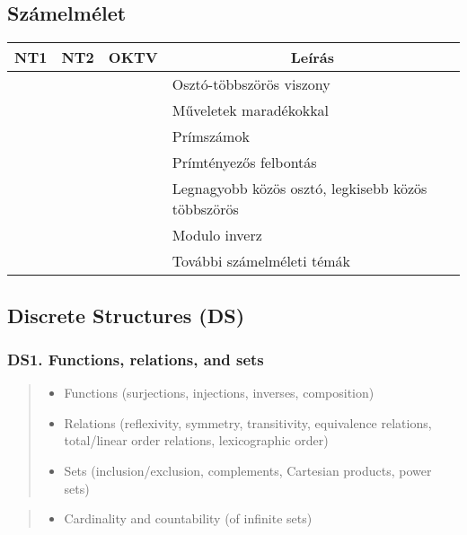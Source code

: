\documentclass[a4paper,11pt,oneside]{article}
\newcommand{\cmark}{\ding{51}}%
\newcommand{\xmark}{\ding{55}}%
\newcommand{\CC}[1]{#1}
\newcommand{\cincl}{{\small\cmark}}
\newcommand{\cdefi}{{\small\cmark\faFileTextO}}
\newcommand{\cemay}{{\small\xmark\faQuestionCircle}}
\newcommand{\cexcl}{{\small\xmark}}
\newcommand{\Idefine}{\item[\hbox to 1.8em{\cdefi\hfill}]}
\newcommand{\Iexcluded}{\item[\hbox to 1.8em{\cexcl\hfill}]}
\newcommand{\ctable}[1]{
    \begin{center}
        \begin{longtable}{ | C | C | C | m{8cm} | } %
        \hline
        \textbf{NT1} & \textbf{NT2} & \textbf{OKTV} & \multicolumn{1}{|c|}{\textbf{Leírás}} \\ \hline
        \endhead
        #1
        \end{longtable}
    \end{center}
}
\newenvironment{myitemize}{\begin{quote}\begin{itemize}\itemsep 0pt}{\end{itemize}\end{quote}}
\begin{document}
\subsection{Számelmélet} %

\ctable {
    \cincl & \cincl & \cincl & Osztó-többszörös viszony
    \\ \hline %
    \cincl & \cincl & \cincl & Műveletek maradékokkal 
    \\ \hline %
    \cdefi & \cincl & \cincl & Prímszámok 
    \\ \hline %
    \cemay & \cdefi & \cdefi & Prímtényezős felbontás 
    \\ \hline %
    \cincl & \cincl & \cincl & Legnagyobb közös osztó, legkisebb közös többszörös 
    \\ \hline %
    \cexcl & \cexcl & \cemay & Modulo inverz 
    \\ \hline %
    \cexcl & \cemay & \cemay & További számelméleti témák 
    \\ \hline %
    
}


\subsection {Discrete Structures (DS)}%
\label{subsubsec:DS}

    \subsubsection*{DS1. Functions, relations, and sets}

        \begin{myitemize}
        \Idefine\CC{Functions (surjections, injections, inverses, composition)}
        \Idefine\CC{Relations (reflexivity, symmetry, transitivity, equivalence relations,
        total/linear order relations, lexicographic order)}
        \Idefine\CC{Sets (inclusion/exclusion, complements, Cartesian products, power sets)}
        \end{myitemize}

        \begin{myitemize}
        \Iexcluded{Cardinality and countability} (of infinite sets)
        \end{myitemize}
  
\end{document}
